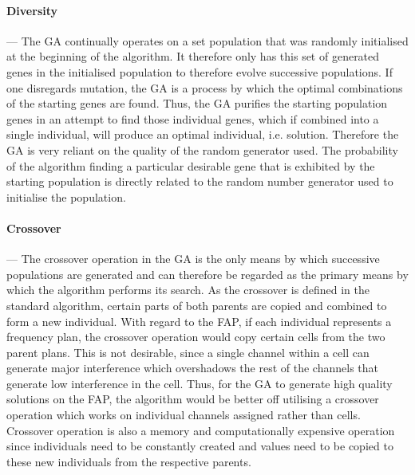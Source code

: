 \paragraph{Diversity}
--- The \gls{GA} continually operates on a set population that was randomly initialised at the beginning of the algorithm. It therefore only has this set of generated genes in the initialised population to therefore evolve successive populations.
If one disregards mutation, the \gls{GA} is a process by which the optimal combinations of the starting genes are found. Thus, the \gls{GA} purifies the starting population genes in an attempt to find those individual genes, which if combined into a single individual, will produce an optimal individual, i.e. solution. Therefore the \gls{GA} is very reliant on the quality of the random generator used. The probability of the algorithm finding a particular desirable gene that is exhibited by the starting population is directly related to the random number generator used to initialise the population. 
\paragraph{Crossover}
--- The crossover operation in the \gls{GA} is the only means by which successive populations are generated and can therefore be regarded as the primary means by which the algorithm performs its search. As the crossover is defined in the standard algorithm, certain parts of both parents are copied and combined to form a new individual. With regard to the \gls{FAP}, if each individual represents a frequency plan, the crossover operation would copy certain cells from the two parent plans. This is not desirable, since a single channel within a cell can generate major interference which overshadows the rest of the channels that generate low interference in the cell. Thus, for the \gls{GA} to generate high quality solutions on the \gls{FAP}, the algorithm would be better off utilising a crossover operation which works on individual channels assigned rather than cells. Crossover operation is also a memory and computationally expensive operation since individuals need to be constantly created and values need to be copied to these new individuals from the respective parents.
